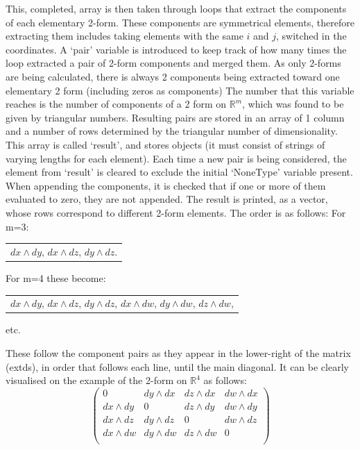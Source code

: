 \documentclass[11]{report}
\begin{document}
\noindent This, completed, array is then taken through loops that extract the components of each elementary 2-form. These components are symmetrical elements, therefore extracting them includes taking elements with the same $i$ and $j$, switched in the coordinates. A `pair' variable is introduced to keep track of how many times the loop extracted a pair of 2-form components and merged them. As only 2-forms are being calculated, there is always 2 components being extracted toward one elementary 2 form (including zeros as components) The number that this variable reaches is the number of components of a 2 form on $\mathbb{R}^{m}$, which was found to be given by triangular numbers. Resulting pairs are stored in an array of 1 column and a number of rows determined  by the triangular number of dimensionality. This array is called `result', and stores objects (it must consist of strings of varying lengths for each element). Each time a new pair is being considered, the element from `result' is cleared to exclude the initial `NoneType' variable present. When appending the components, it is checked that if one or more of them evaluated to zero, they are not appended.
The result is printed, as a vector, whose rows correspond to different 2-form elements. The order is as follows:
For m=3:
\begin{center}
	\begin{tabular}{c}
		$ dx \wedge dy$, 
		$ dx \wedge dz$, 
		$ dy \wedge dz$.
	\end{tabular}
\end{center}

For m=4 these become:

\begin{center}
	\begin{tabular}{c}
		$ dx \wedge dy$,
		$ dx \wedge dz$,
		$ dy \wedge dz$,
		$ dx \wedge dw$,
		$ dy \wedge dw$,
		$ dz \wedge dw$,
		
	\end{tabular}
\end{center}
etc.

These follow the component pairs as they appear in the lower-right of the matrix (ext\textunderscore ds), in order that follows each line, until the main diagonal.
It can be clearly visualised on the example of the 2-form on $\mathbb{R}^{4}$ as follows:
\begin{equation}
		\begin{pmatrix}
			0 & dy \wedge dx & dz \wedge dx & dw \wedge dx \\
			dx \wedge dy & 0 & dz \wedge dy & dw \wedge dy \\
			dx \wedge dz & dy \wedge dz & 0 & dw \wedge dz \\
			dx \wedge dw & dy \wedge dw & dz \wedge dw & 0 \\
		\end{pmatrix}
\end{equation}
\end{document}
